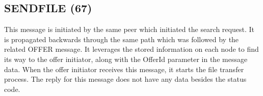 \begin{figure}[H]
    \centering
\end{figure}

\subsection{SENDFILE (67)}

This message is initiated by the same peer which initiated the search request. 
It is propagated backwards through the same path which was followed by the 
related OFFER message. It leverages the stored information on each node to find 
its way to the offer initiator, along with the OfferId parameter in the message 
data. When the offer initiator receives this message, it starts the file 
transfer process. The reply for this message does not have any data besides the 
status code.

\begin{figure}[H]
    \centering
\end{figure}
